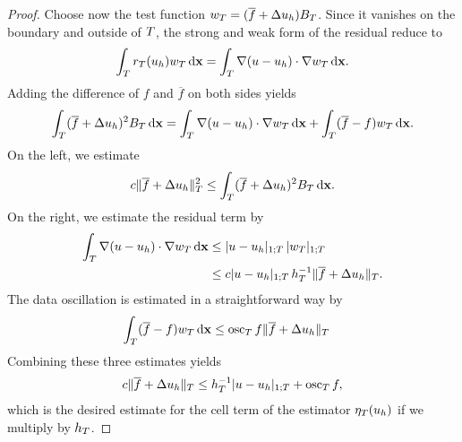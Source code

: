 \begin{proof}
    Choose now the test function
    $w_T = (\overline f + \Delta u_h) B_T$. Since it vanishes
    on the boundary and outside of $T$, the strong and weak form
    of the residual reduce to
    \begin{gather}
      \int_T r_T(u_h) w_T \,\mathrm{d} \mathbf x = \int_T \nabla(u-u_h)\cdot\nabla w_T \,\mathrm{d} \mathbf x.
    \end{gather}
    Adding the difference of $f$ and $\overline f$ on both sides yields
    \begin{gather}
      \int_T (\overline f+\Delta u_h)^2 B_T \,\mathrm{d} \mathbf x
      =\int_T \nabla(u-u_h)\cdot\nabla w_T \,\mathrm{d} \mathbf x
      + \int_T (\overline f - f) w_T \,\mathrm{d} \mathbf x.
    \end{gather}
    On the left, we estimate
    \begin{gather}
      c \lVert\overline f + \Delta u_h\rVert_T^2 \le \int_T (\overline f+\Delta u_h)^2 B_T \,\mathrm{d} \mathbf x.
    \end{gather}
    On the right, we estimate the residual term by
    \begin{align*}
      \int_T \nabla(u-u_h)\cdot\nabla w_T \,\mathrm{d} \mathbf x
      & \le \lvert u-u_h\rvert_{1;T} \,\lvert w_T\rvert_{1;T}
      \\
      & \le c \lvert u-u_h\rvert_{1;T} \, h_T^{-1} \lVert\overline f + \Delta u_h\rVert_T.
    \end{align*}
    The data oscillation is estimated in a straightforward way by
    \begin{align*}
      \int_T (\overline f-f) w_T \,\mathrm{d} \mathbf x
      &\le \operatorname{osc}_T f \lVert\overline f+\Delta u_h\rVert_T
    \end{align*}
    Combining these three estimates yields
    \begin{gather}
      \label{eq:fem-aposteriori:9}
      c \lVert\overline f+\Delta u_h\rVert_T
      \le h_T^{-1} \lvert u-u_h\rvert_{1;T}
      + \operatorname{osc}_T f,
    \end{gather}
    which is the desired estimate for the cell term of the estimator
    $\eta_{T}(u_h)$ if we multiply by $h_T$.


\end{proof}
